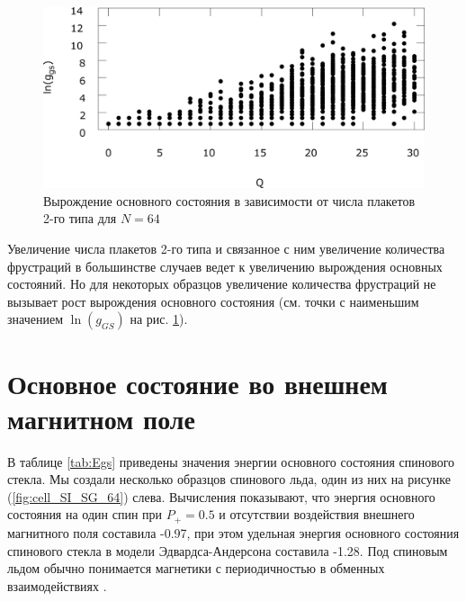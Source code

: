 \documentclass[utf8, babel, sor, jor, amsmath, amssymb, reprint]{elsarticle} %
\begin{document}
\begin{figure}[H]
	\centering
	\includegraphics[width=0.9\linewidth]{pictures/g_Q.eps}
	\caption{Вырождение основного состояния в зависимости от числа плакетов 2-го типа для $N=64$}
	\label{fig:g(Q)}
\end{figure}

Увеличение числа плакетов 2-го типа и связанное с ним увеличение количества фрустраций в большинстве случаев ведет к увеличению вырождения основных состояний. Но для некоторых образцов увеличение количества фрустраций не вызывает рост вырождения основного состояния (см. точки с наименьшим значением $\ln{(g_{GS})}$ на рис. \ref{fig:g(Q)}). 

\section{Основное состояние во внешнем магнитном поле}

В таблице \ref{tab:Egs} приведены значения энергии основного состояния спинового стекла. Мы создали несколько образцов спинового льда, один из них на рисунке (\ref{fig:cell_SI_SG_64}) слева. Вычисления показывают, что энергия основного состояния на один спин при $P_+ = 0.5$ и отсутствии воздействия внешнего магнитного поля составила -0.97, при этом удельная энергия основного состояния спинового стекла в модели Эдвардса-Андерсона составила -1.28. Под спиновым льдом обычно понимается магнетики с периодичностью в обменных взаимодействиях \cite{peretyatko2017interplay, otsuka2018husimi, andriushchenko2019large, shevchenko2017effect, kato2022flux}. 
\end{document}
